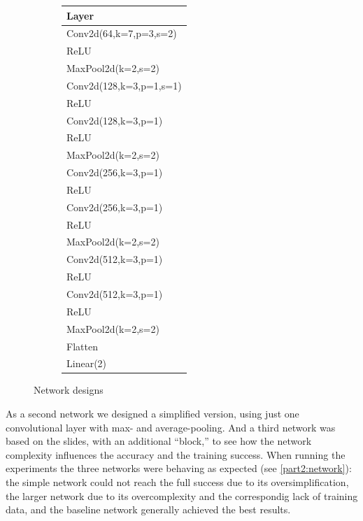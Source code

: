\documentclass[sigconf,nonacm]{acmart}
\begin{document}
\begin{figure}[ht]
\begin{subfigure}[c]{0.3\columnwidth}
    \scriptsize
    \begin{tabular}{l}
      Layer \\
      \hline
      Conv2d(64,k=7,p=3,s=2) \\
      ReLU  \\
      MaxPool2d(k=2,s=2) \\
      Conv2d(128,k=3,p=1,s=1) \\
      ReLU \\
      Conv2d(128,k=3,p=1)  \\
      ReLU \\
      MaxPool2d(k=2,s=2) \\
      Conv2d(256,k=3,p=1) \\
      ReLU \\
      Conv2d(256,k=3,p=1) \\
      ReLU \\
      MaxPool2d(k=2,s=2) \\
      Conv2d(512,k=3,p=1) \\
      ReLU \\
      Conv2d(512,k=3,p=1) \\
      ReLU \\
      MaxPool2d(k=2,s=2) \\
      Flatten \\
      Linear(2) 
    \end{tabular}
  \end{subfigure}
  \label{part2:networks}
  \caption{Network designs}
\end{figure}


As a second network we designed a simplified version, using
just one convolutional layer with max- and average-pooling.
And a third network was based on the slides, with an
additional ``block,'' to see how the network complexity
influences the accuracy and the training success.
When running the experiments the three networks
were behaving as expected (see \ref{part2:network}): the simple network could not
reach the full success due to its oversimplification,
the larger network due to its overcomplexity and the
correspondig lack of training data,
and the baseline network generally achieved the best
results.
\end{document}
